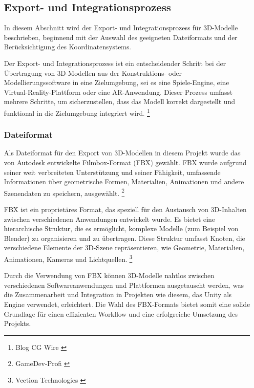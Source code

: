 \subsection{Export- und Integrationsprozess}
In diesem Abschnitt wird der Export- und Integrationsprozess für 3D-Modelle beschrieben, beginnend mit der Auswahl des geeigneten Dateiformats und der Berücksichtigung des Koordinatensystems.

Der Export- und Integrationsprozess ist ein entscheidender Schritt bei der Übertragung von 3D-Modellen aus der Konstruktions- oder Modellierungssoftware in eine Zielumgebung, sei es eine Spiele-Engine, eine Virtual-Reality-Plattform oder eine AR-Anwendung. Dieser Prozess umfasst mehrere Schritte, um sicherzustellen, dass das Modell korrekt dargestellt und funktional in die Zielumgebung integriert wird. \footnote{Blog CG Wire \cite {Getting started with export in Blender}}

\subsubsection{Dateiformat}
Als Dateiformat für den Export von 3D-Modellen in diesem Projekt wurde das von Autodesk entwickelte Filmbox-Format (FBX) gewählt. FBX wurde aufgrund seiner weit verbreiteten Unterstützung und seiner Fähigkeit, umfassende Informationen über geometrische Formen, Materialien, Animationen und andere Szenendaten zu speichern, ausgewählt. \footnote{GameDev-Profi \cite{Welches Dateiformat}}

FBX ist ein proprietäres Format, das speziell für den Austausch von 3D-Inhalten zwischen verschiedenen Anwendungen entwickelt wurde. Es bietet eine hierarchische Struktur, die es ermöglicht, komplexe Modelle (zum Beispiel von Blender) zu organisieren und zu übertragen. Diese Struktur umfasst Knoten, die verschiedene Elemente der 3D-Szene repräsentieren, wie Geometrie, Materialien, Animationen, Kameras und Lichtquellen. \footnote{Vection Technologies \cite {Everything You Need to Know About FBX Files}}

Durch die Verwendung von FBX können 3D-Modelle nahtlos zwischen verschiedenen Softwareanwendungen und Plattformen ausgetauscht werden, was die Zusammenarbeit und Integration in Projekten wie diesem, das Unity als Engine verwendet, erleichtert. Die Wahl des FBX-Formats bietet somit eine solide Grundlage für einen effizienten Workflow und eine erfolgreiche Umsetzung des Projekts.


